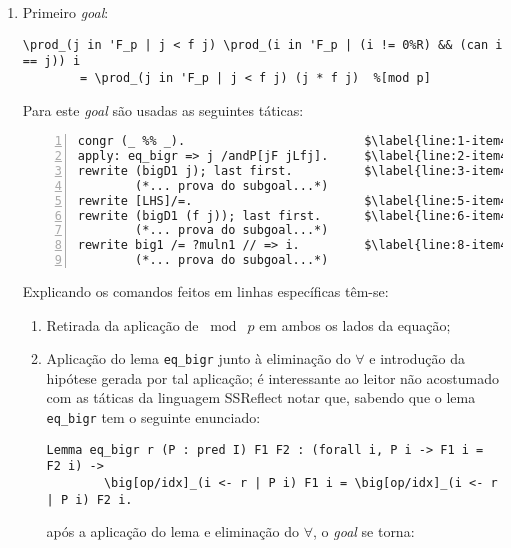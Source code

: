 \begin{enumerate}[label=\textbf{\roman*.}]
        \begin{enumerate}[label=\textbf{(\alph*)}]
                \item Primeiro \textit{goal}:
                
                        \begin{lstlisting}[language=coq,frame=single,tabsize=1]
\prod_(j in 'F_p | j < f j) \prod_(i in 'F_p | (i != 0%R) && (can i == j)) i
        = \prod_(j in 'F_p | j < f j) (j * f j)  %[mod p]
                        \end{lstlisting}
                
                Para este \textit{goal} são usadas as seguintes táticas:
                
                        \begin{lstlisting}[language=coq,frame=single, numbers=left,stepnumber=1,tabsize=1, escapechar=\$]
congr (_ %% _).                         $\label{line:1-item4-2}$
apply: eq_bigr => j /andP[jF jLfj].     $\label{line:2-item4-2}$
rewrite (bigD1 j); last first.          $\label{line:3-item4-2}$
        (*... prova do subgoal...*)
rewrite [LHS]/=.                        $\label{line:5-item4-2}$
rewrite (bigD1 (f j)); last first.      $\label{line:6-item4-2}$
        (*... prova do subgoal...*)
rewrite big1 /= ?muln1 // => i.         $\label{line:8-item4-2}$
        (*... prova do subgoal...*)
                        \end{lstlisting}
                
                Explicando os comandos feitos em linhas específicas têm-se:
        
                \begin{enumerate}[listparindent=\parindent]
                
                        \item[\textbf{(\ref{line:1-item4-2})}] Retirada da aplicação de $\bmod \; p$ em ambos os lados da equação;
                
                        \item[\textbf{(\ref{line:2-item4-2})}] Aplicação do lema \lstinline[language=coq]|eq_bigr| junto à eliminação do $\forall$ e introdução da hipótese gerada por tal aplicação; é interessante ao leitor não acostumado com as táticas da linguagem SSReflect notar que, sabendo que o lema \lstinline[language=coq]|eq_bigr| tem o seguinte enunciado:
        
                                \begin{lstlisting}[language=coq,frame=single,tabsize=1]
Lemma eq_bigr r (P : pred I) F1 F2 : (forall i, P i -> F1 i = F2 i) ->
        \big[op/idx]_(i <- r | P i) F1 i = \big[op/idx]_(i <- r | P i) F2 i.
                                \end{lstlisting}
                        após a aplicação do lema e eliminação do $\forall$, o \textit{goal} se torna:
                        

\end{enumerate}
\end{enumerate}
\end{enumerate}
